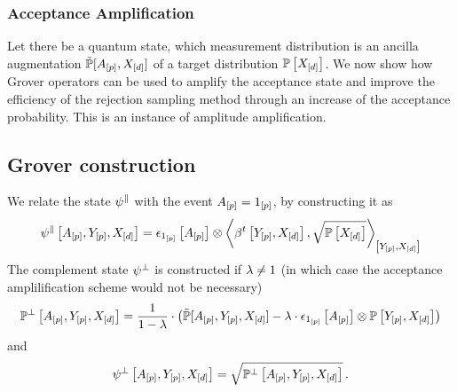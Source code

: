 


\subsubsection{Acceptance Amplification}

Let there be a quantum state, which measurement distribution is an ancilla augmentation $\tilde{\mathbb{P}}[A_{[p]},X_{[d]}]$ of a target distribution $\mathbb{P}\left[X_{[d]}\right]$.
We now show how Grover operators can be used to amplify the acceptance state and improve the efficiency of the rejection sampling method through an increase of the acceptance probability.
This is an instance of amplitude amplification.

\subsection{Grover construction}

We relate the state $\psi^{\parallel}$ with the event $A_{[p]}=1_{[p]}$, by constructing it as
\begin{align*}
    \qstateofat{\goodstatesymbol}{\avariables,\headvariables,\shortcatvariables}
    =\onehotmapofat{\onetuple{[\seldim]}}{\avariables}
    \otimes \contractionof{\bencodingofat{\sstat}{\headvariables,\shortcatvariables},\sqrt{\probwith}}{\headvariables,\shortcatvariables}
\end{align*}
The complement state $\psi^{\perp}$ is constructed if $\lambda\neq1$ (in which case the acceptance amplilification scheme would not be necessary)
\begin{align*}
    \mathbb{P}^{\perp}\left[A_{[p]},Y_{[p]},X_{[d]}\right]
    = \frac{1}{1-\lambda}
    \cdot\left(
             \tilde{\mathbb{P}}[A_{[p]},Y_{[p]},X_{[d]}]-\lambda \cdot \epsilon_{1_{[p]}}\left[A_{[p]}\right]\otimes\mathbb{P}\left[Y_{[p]},X_{[d]}\right]
    \right)
\end{align*}
and
\begin{align*}
    \psi^{\perp}\left[A_{[p]},Y_{[p]},X_{[d]}\right]=\sqrt{\mathbb{P}^{\perp}\left[A_{[p]},Y_{[p]},X_{[d]}\right]} \, .
\end{align*}


